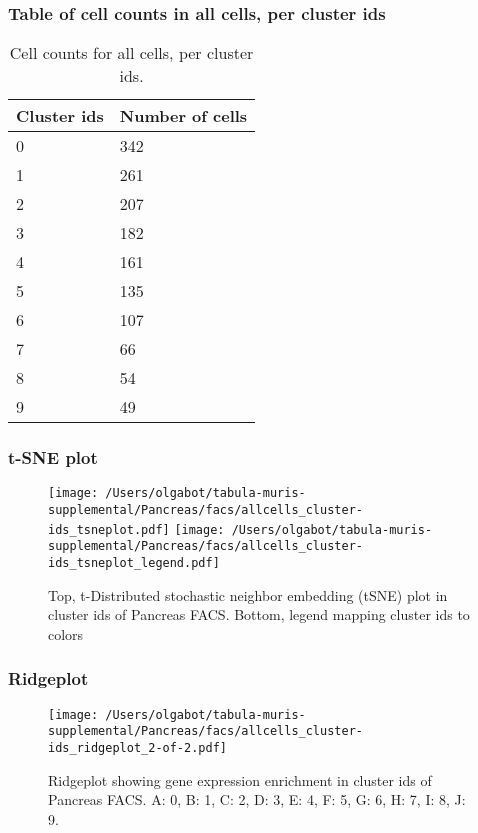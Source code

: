 \subsubsection{Table of cell counts in all cells, per cluster ids}\begin{table}[h]
\centering
\label{my-label}
\begin{tabular}{@{}ll@{}}
\toprule

Cluster ids& Number of cells \\ \midrule
0 & 342 \\

1 & 261 \\

2 & 207 \\

3 & 182 \\

4 & 161 \\

5 & 135 \\

6 & 107 \\

7 & 66 \\

8 & 54 \\

9 & 49 \\
\bottomrule
\end{tabular}
\caption{Cell counts for all cells, per cluster ids.}
\end{table}

\newpage
\subsubsection{t-SNE plot}
\begin{figure}[h]
\centering
\texttt{[image: /Users/olgabot/tabula-muris-supplemental/Pancreas/facs/allcells\_cluster-ids\_tsneplot.pdf]}
\texttt{[image: /Users/olgabot/tabula-muris-supplemental/Pancreas/facs/allcells\_cluster-ids\_tsneplot\_legend.pdf]}
\caption{Top, t-Distributed stochastic neighbor embedding (tSNE) plot  in cluster ids of Pancreas FACS. Bottom, legend mapping cluster ids to colors}
\end{figure}


\newpage
\newpage
\subsubsection{Ridgeplot}
\begin{figure}[h]
\centering
\texttt{[image: /Users/olgabot/tabula-muris-supplemental/Pancreas/facs/allcells\_cluster-ids\_ridgeplot\_2-of-2.pdf]}

\caption{ Ridgeplot  showing gene expression enrichment in cluster ids of Pancreas FACS. A: 0, B: 1, C: 2, D: 3, E: 4, F: 5, G: 6, H: 7, I: 8, J: 9.}
\end{figure}


